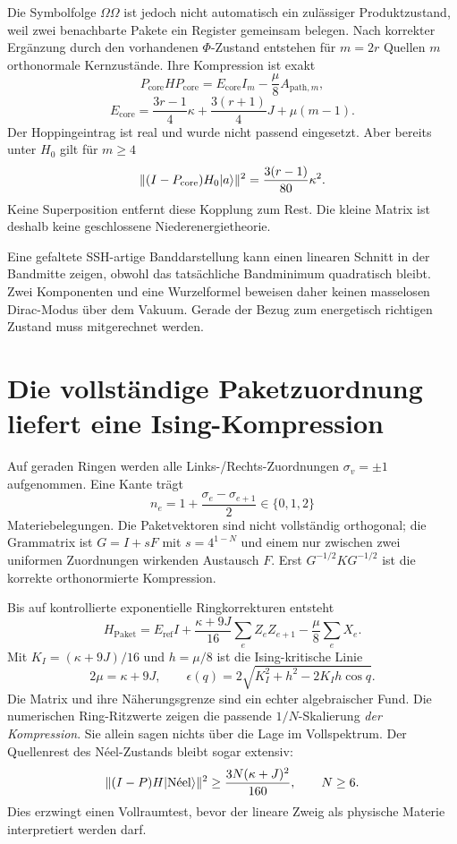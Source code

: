 Die Symbolfolge $\Omega\Omega$ ist jedoch nicht automatisch ein zulässiger Produktzustand, weil zwei benachbarte Pakete ein Register gemeinsam belegen. Nach korrekter Ergänzung durch den vorhandenen $\Phi$-Zustand entstehen für $m=2r$ Quellen $m$ orthonormale Kernzustände. Ihre Kompression ist exakt
\[
 P_{\mathrm{core}}HP_{\mathrm{core}}
 =E_{\mathrm{core}}I_m-\frac\mu8A_{\mathrm{path},m},
\]
\[
 E_{\mathrm{core}}=\frac{3r-1}{4}\kappa+\frac{3(r+1)}4J+\mu(m-1).
\]
Der Hoppingeintrag ist real und wurde nicht passend eingesetzt. Aber bereits unter $H_0$ gilt für $m\ge4$
\[
 \|(I-P_{\mathrm{core}})H_0\lvert a\rangle\|^2
 =\frac{3(r-1)}{80}\kappa^2.
\]
Keine Superposition entfernt diese Kopplung zum Rest. Die kleine Matrix ist deshalb keine geschlossene Niederenergietheorie. 

Eine gefaltete SSH-artige Banddarstellung kann einen linearen Schnitt in der Bandmitte zeigen, obwohl das tatsächliche Bandminimum quadratisch bleibt. Zwei Komponenten und eine Wurzelformel beweisen daher keinen masselosen Dirac-Modus über dem Vakuum. Gerade der Bezug zum energetisch richtigen Zustand muss mitgerechnet werden.

\section{Die vollständige Paketzuordnung liefert eine Ising-Kompression}
Auf geraden Ringen werden alle Links-/Rechts-Zuordnungen $\sigma_v=\pm1$ aufgenommen. Eine Kante trägt
\[
 n_e=1+\frac{\sigma_e-\sigma_{e+1}}2\in\{0,1,2\}
\]
Materiebelegungen. Die Paketvektoren sind nicht vollständig orthogonal; die Grammatrix ist $G=I+sF$ mit $s=4^{1-N}$ und einem nur zwischen zwei uniformen Zuordnungen wirkenden Austausch $F$. Erst $G^{-1/2}KG^{-1/2}$ ist die korrekte orthonormierte Kompression. 

Bis auf kontrollierte exponentielle Ringkorrekturen entsteht
\[
 H_{\mathrm{Paket}}=E_{\mathrm{ref}}I
 +\frac{\kappa+9J}{16}\sum_e Z_eZ_{e+1}
 -\frac\mu8\sum_e X_e.
\]
Mit $K_I=(\kappa+9J)/16$ und $h=\mu/8$ ist die Ising-kritische Linie
\[
 2\mu=\kappa+9J,\qquad
 \epsilon(q)=2\sqrt{K_I^2+h^2-2K_Ih\cos q}.
\]
Die Matrix und ihre Näherungsgrenze sind ein echter algebraischer Fund. Die numerischen Ring-Ritzwerte zeigen die passende $1/N$-Skalierung \emph{der Kompression}. Sie allein sagen nichts über die Lage im Vollspektrum. Der Quellenrest des Néel-Zustands bleibt sogar extensiv:
\[
 \|(I-P)H\lvert \mathrm{N\acute eel}\rangle\|^2
 \ge\frac{3N(\kappa+J)^2}{160},\qquad N\ge6.
\]
Dies erzwingt einen Vollraumtest, bevor der lineare Zweig als physische Materie interpretiert werden darf. 

